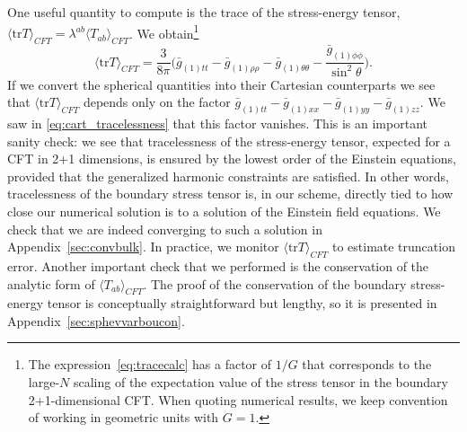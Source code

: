 \documentclass[a4paper,11pt]{article}
\numberwithin{equation}{section}
\begin{document}
One useful quantity to compute is the trace of the stress-energy tensor, $\langle \text{tr}T\rangle_{CFT}=\lambda^{ab} \langle T_{ab}\rangle_{CFT}$. We obtain\footnote{The expression~\eqref{eq:tracecalc} has a factor of $1/G$ that corresponds to the large-$N$ scaling of the expectation value of the stress tensor in the boundary 2+1-dimensional CFT. When quoting numerical results, we keep convention of working in geometric units with $G=1$.}
\begin{equation}
\label{eq:tracecalc}
\langle \text{tr}T\rangle_{CFT}=\frac{3}{8\pi}\biggl(\bar{g}_{(1)tt}-\bar{g}_{(1)\rho\rho}-\bar{g}_{(1)\theta\theta}-\frac{\bar{g}_{(1)\phi\phi}}{\sin^2\theta}\biggr).
\end{equation}
If we convert the spherical quantities into their Cartesian counterparts 
we see that $\langle \text{tr}T\rangle_{CFT}$ depends only on the factor $\bar{g}_{(1)tt}-\bar{g}_{(1)xx}-\bar{g}_{(1)yy}-\bar{g}_{(1)zz}$. %
We saw in \eqref{eq:cart_tracelessness} that this factor vanishes.
This is an important sanity check: we see that tracelessness of the stress-energy tensor, expected for a CFT in 2+1 dimensions, is ensured by the lowest order of the Einstein equations, provided that the generalized harmonic constraints are satisfied.
In other words, tracelessness of the boundary stress tensor is, in our scheme, directly tied to how close our numerical solution is to a solution of the Einstein field equations. 
We check that we are indeed converging to such a solution in Appendix~\ref{sec:convbulk}.
In practice, we monitor $\langle \text{tr}T\rangle_{CFT}$ to estimate truncation error.
Another important check that we performed is the conservation of the analytic form of $\langle T_{ab}\rangle_{CFT}$. The proof of the conservation of the boundary stress-energy tensor is conceptually straightforward but lengthy, so it is presented in Appendix~\ref{sec:sphevvarboucon}.
\end{document}
